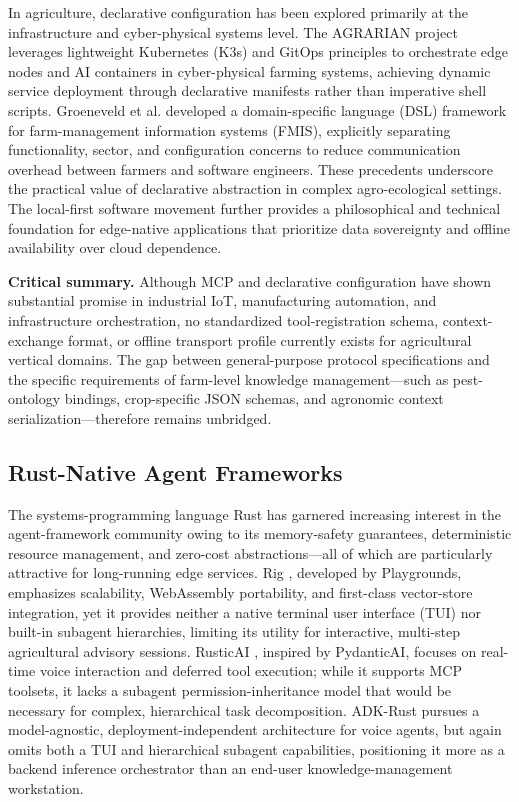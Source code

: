 In agriculture, declarative configuration has been explored primarily at the infrastructure and cyber-physical systems level. The AGRARIAN project \cite{agrarian2025} leverages lightweight Kubernetes (K3s) and GitOps principles to orchestrate edge nodes and AI containers in cyber-physical farming systems, achieving dynamic service deployment through declarative manifests rather than imperative shell scripts. Groeneveld et al. \cite{groeneveld2021dsl} developed a domain-specific language (DSL) framework for farm-management information systems (FMIS), explicitly separating functionality, sector, and configuration concerns to reduce communication overhead between farmers and software engineers. These precedents underscore the practical value of declarative abstraction in complex agro-ecological settings. The local-first software movement \cite{kleppmann2021localfirst} further provides a philosophical and technical foundation for edge-native applications that prioritize data sovereignty and offline availability over cloud dependence.

\textbf{Critical summary.} Although MCP and declarative configuration have shown substantial promise in industrial IoT, manufacturing automation, and infrastructure orchestration, no standardized tool-registration schema, context-exchange format, or offline transport profile currently exists for agricultural vertical domains. The gap between general-purpose protocol specifications and the specific requirements of farm-level knowledge management---such as pest-ontology bindings, crop-specific JSON schemas, and agronomic context serialization---therefore remains unbridged.

\subsection{Rust-Native Agent Frameworks}

The systems-programming language Rust has garnered increasing interest in the agent-framework community owing to its memory-safety guarantees, deterministic resource management, and zero-cost abstractions---all of which are particularly attractive for long-running edge services. Rig \cite{playgrounds2025rig}, developed by Playgrounds, emphasizes scalability, WebAssembly portability, and first-class vector-store integration, yet it provides neither a native terminal user interface (TUI) nor built-in subagent hierarchies, limiting its utility for interactive, multi-step agricultural advisory sessions. RusticAI \cite{rusticai2025}, inspired by PydanticAI, focuses on real-time voice interaction and deferred tool execution; while it supports MCP toolsets, it lacks a subagent permission-inheritance model that would be necessary for complex, hierarchical task decomposition. ADK-Rust \cite{zavora2025adkrust} pursues a model-agnostic, deployment-independent architecture for voice agents, but again omits both a TUI and hierarchical subagent capabilities, positioning it more as a backend inference orchestrator than an end-user knowledge-management workstation.

